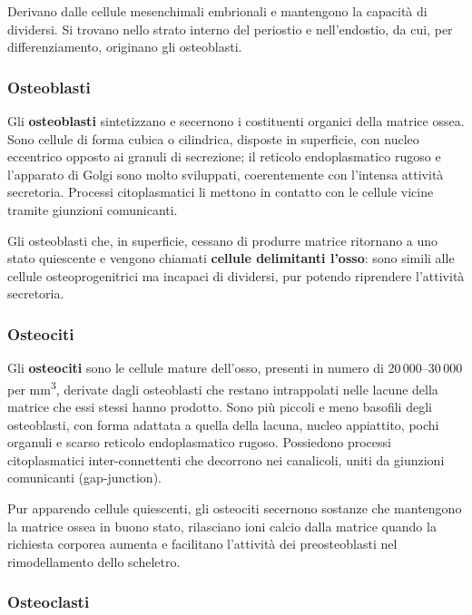 Derivano dalle cellule mesenchimali embrionali e mantengono la capacità di
dividersi. Si trovano nello strato interno del periostio e nell'endostio, da
cui, per differenziamento, originano gli osteoblasti.

\subsubsection{Osteoblasti}

Gli \textbf{osteoblasti} sintetizzano e secernono i costituenti organici
della matrice ossea. Sono cellule di forma cubica o cilindrica, disposte in
superficie, con nucleo eccentrico opposto ai granuli di secrezione; il
reticolo endoplasmatico rugoso e l'apparato di Golgi sono molto sviluppati,
coerentemente con l'intensa attività secretoria. Processi citoplasmatici li
mettono in contatto con le cellule vicine tramite giunzioni comunicanti.

Gli osteoblasti che, in superficie, cessano di produrre matrice ritornano a
uno stato quiescente e vengono chiamati \textbf{cellule delimitanti l'osso}:
sono simili alle cellule osteoprogenitrici ma incapaci di dividersi, pur
potendo riprendere l'attività secretoria.

\subsubsection{Osteociti}

Gli \textbf{osteociti} sono le cellule mature dell'osso, presenti in numero
di 20\,000--30\,000 per mm\textsuperscript{3}, derivate dagli osteoblasti che
restano intrappolati nelle lacune della matrice che essi stessi hanno
prodotto. Sono più piccoli e meno basofili degli osteoblasti, con forma
adattata a quella della lacuna, nucleo appiattito, pochi organuli e scarso
reticolo endoplasmatico rugoso. Possiedono processi citoplasmatici
inter-connettenti che decorrono nei canalicoli, uniti da giunzioni
comunicanti (gap-junction).

Pur apparendo cellule quiescenti, gli osteociti secernono sostanze che
mantengono la matrice ossea in buono stato, rilasciano ioni calcio dalla
matrice quando la richiesta corporea aumenta e facilitano l'attività dei
preosteoblasti nel rimodellamento dello scheletro.

\subsubsection{Osteoclasti}

